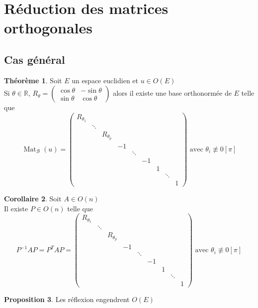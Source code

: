 \documentclass[10pt,a4paper]{article}
\theoremstyle{definition}
\newtheorem{proposition}{Proposition}[section]
\newtheorem{theorem}[proposition]{Théorème}
\newtheorem{corollary}[proposition]{Corollaire}
\DeclareMathOperator*{\mat}{Mat}
\begin{document}
\section{Réduction des matrices orthogonales}
\subsection{Cas général}
\begin{theorem}
    Soit \(E\) un espace euclidien et \(u \in O(E)\) \\
    Si \(\theta \in \mathbb{R}\), \(R_\theta = \begin{pmatrix}
        \cos \theta & - \sin \theta \\
        \sin \theta & \cos \theta
    \end{pmatrix}\) alors il existe une base orthonormée de \(E\) telle que
    \[\mat_{\mathcal{B}}(u) = \begin{pmatrix}
        \boxed{R_{\theta_1}} & & & & & & & & \\
        & \ddots & & & & & & & \\
        & & \boxed{R_{\theta_p}} & & & & & & \\
        & & & -1 & & & & & \\
        & & & & \ddots & & & & \\
        & & & & & -1 & & & \\
        & & & & & & 1 & & \\
        & & & & & & & \ddots & \\
        & & & & & & & & 1
    \end{pmatrix} \text{ avec } \theta_i \not\equiv 0 [\pi]\]
\end{theorem}
\begin{corollary}
    Soit \(A \in O(n)\) \\
    Il existe \(P \in O(n)\) telle que
    \[P^{-1} A P = P^T A P = \begin{pmatrix}
        \boxed{R_{\theta_1}} & & & & & & & & \\
        & \ddots & & & & & & & \\
        & & \boxed{R_{\theta_p}} & & & & & & \\
        & & & -1 & & & & & \\
        & & & & \ddots & & & & \\
        & & & & & -1 & & & \\
        & & & & & & 1 & & \\
        & & & & & & & \ddots & \\
        & & & & & & & & 1
    \end{pmatrix} \text{ avec } \theta_i \not\equiv 0 [\pi]\]
\end{corollary}
\begin{proposition}
    Les réflexion engendrent \(O(E)\)
\end{proposition}
\end{document}
